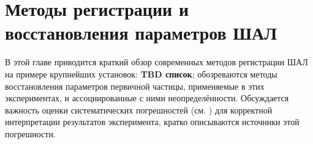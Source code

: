 \chapter{Методы регистрации и восстановления параметров ШАЛ}

В этой главе приводится краткий обзор современных методов регистрации ШАЛ на примере крупнейших установок: \textbf{TBD список}; обозреваются методы восстановления параметров первичной частицы, применяемые в этих экспериментах, и ассоциированные с ними неопределённости. Обсуждается важность оценки систематических погрешностей (см. \cite{wg2013}) для корректной интерпретации результатов эксперимента, кратко описываются источники этой погрешности.